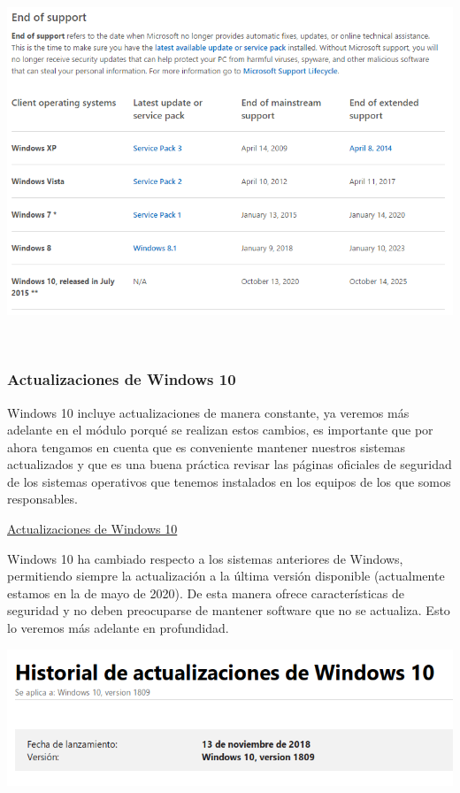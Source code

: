 \documentclass[11pt]{article}
\begin{document}
\begin{center}
\includegraphics[width=.9\linewidth]{Versiones/fin-soporte-windows.png}
\end{center}  

\subsubsection{Actualizaciones de Windows 10}
\label{sec:org9ec851f}
Windows 10 incluye actualizaciones de manera constante, ya veremos más
adelante en el módulo porqué se realizan estos cambios, es importante
que por ahora tengamos en cuenta que es conveniente mantener nuestros
sistemas actualizados y que es una buena práctica revisar las páginas
oficiales de seguridad de los sistemas operativos que tenemos instalados
en los equipos de los que somos responsables.

\href{https://support.microsoft.com/es-es/help/4464619/windows-10-update-history}{Actualizaciones
de Windows 10}

Windows 10 ha cambiado respecto a los sistemas anteriores de Windows,
permitiendo siempre la actualización a la última versión disponible
(actualmente estamos en la de mayo de 2020). De esta manera ofrece características
de seguridad y no deben preocuparse de mantener software que no se
actualiza. Esto lo veremos más adelante en profundidad.

\begin{center}
\includegraphics[width=.9\linewidth]{Versiones/windows10-1809.png}
\end{center}  
\end{document}
